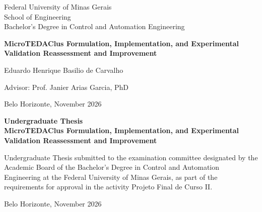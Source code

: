 \begin{titlepage}
\begin{center}
{\large Federal University of Minas Gerais\\
School of Engineering \\
Bachelor's Degree in Control and Automation Engineering\\}

\vspace{6cm}
{\bf\Large MicroTEDAClus Formulation, Implementation, and Experimental Validation Reassessment and Improvement}
\vspace{4cm}

{\large Eduardo Henrique Basilio de Carvalho}
\vspace{2cm}

\vspace{2cm}
{\large Advisor: Prof. Janier Arias Garcia, PhD}

\vfill
{\large Belo Horizonte, November 2026 }
\end{center}

\end{titlepage}

\newpage
\clearpage
\thispagestyle{empty}


\begin{titlepage}

\centering
\textbf{Undergraduate Thesis}\\
\vspace{2cm}
\centering
\textbf{MicroTEDAClus Formulation, Implementation, and Experimental Validation Reassessment and Improvement}\\
\vspace{5cm}

\parbox{1.0\textwidth}
{\large
Undergraduate Thesis submitted to the examination committee
designated by the Academic Board of the Bachelor's Degree in
Control and Automation Engineering at the Federal University of
Minas Gerais, as part of the requirements for approval in the
activity Projeto Final de Curso II.}

\vspace{7cm}
\centering
Belo Horizonte, November 2026

\end{titlepage}
